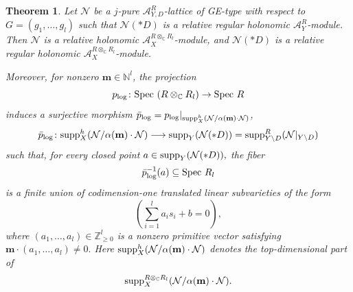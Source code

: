 \documentclass{amsart}
\theoremstyle{plain}
\newtheorem{theorem}{Theorem}
\numberwithin{theorem}{section}
\theoremstyle{definition}
\theoremstyle{remark}
\theoremstyle{definition}
\newcommand{\C}{\mathbb{C}} %
\newcommand{\N}{\mathbb{N}}
\newcommand{\Z}{\mathbb{Z}}
\newcommand{\cN}{\mathcal{N}}
\newcommand{\bm}{\mathbf{m}}
\newcommand{\sA}{\mathscr{A}}
\newcommand{\Spec}{\textup{Spec }}
\newcommand{\supp}{\textup{supp}}
\begin{document}
\begin{theorem}\label{thm:mainsuppfiberation}
Let $\cN$ be a $j$-pure $\sA^R_{Y,D}$-lattice of GE-type with respect to
$G=(g_1,\dots,g_l)$
such that $\cN(*D)$ is a relative regular holonomic $\sA^R_Y$-module. Then $\cN$ is a relative holonomic $\sA_X^{R\otimes_\C R_l}$-module, and $\cN(*D)$ is a relative regular holonomic $\sA_X^{R\otimes_\C R_l}$-module.

Moreover, for nonzero $\bm\in\N^l$, the projection
\[
p_{\log}\colon \Spec(R\otimes_\C R_l)\to \Spec R
\]
induces a surjective morphism $\bar p_{\log}
=
p_{\log}|_{\supp^h_X(\cN/\alpha(\bm)\cdot\cN)}$,
\[
\bar p_{\log}
\colon
\supp^h_X(\cN/\alpha(\bm)\cdot\cN)
\longrightarrow
\supp_Y(\cN(*D))
=
\supp^R_{Y\setminus D}(\cN|_{Y\setminus D})
\]
such that, for every closed point
$a\in \supp_Y(\cN(*D)),$
the fiber
\[
\bar p_{\log}^{-1}(a)\subseteq \Spec R_l
\]
is a finite union of codimension-one translated linear subvarieties of the form
\[
\left(\sum_{i=1}^l a_i s_i+b=0\right),
\]
where $(a_1,\dots,a_l)\in \Z_{\ge 0}^l$ is a nonzero primitive vector satisfying
$\bm\cdot(a_1,\dots,a_l)\neq 0.$
Here
$\supp^h_X(\cN/\alpha(\bm)\cdot\cN)$
denotes the top-dimensional part of
\[
\supp_X^{R\otimes_\C R_l}(\cN/\alpha(\bm)\cdot\cN).
\]
\end{theorem}
\end{document}
